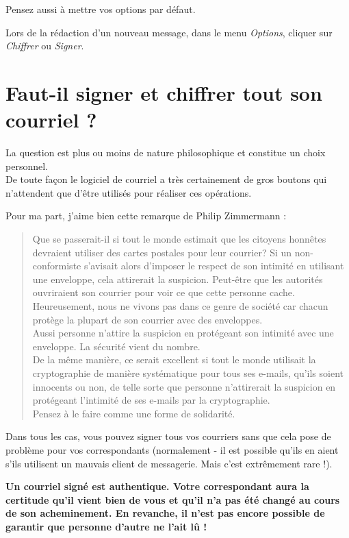 Pensez aussi à mettre vos options par défaut.

Lors de la rédaction d'un nouveau message, dans le menu \emph{Options},
cliquer sur \emph{Chiffrer} ou \emph{Signer}.

\section{Faut-il signer et chiffrer tout son courriel ?}\label{faut-il-signer-et-chiffrer-tout-son-courriel}

La question est plus ou moins de nature philosophique et constitue un
choix personnel.\\De toute façon le logiciel de courriel a très
certainement de gros boutons qui n'attendent que d'être utilisés pour
réaliser ces opérations.

Pour ma part, j'aime bien cette remarque de Philip Zimmermann :

\begin{quote}
Que se passerait-il si tout le monde estimait que les citoyens honnêtes
devraient utiliser des cartes postales pour leur courrier? Si un
non-conformiste s'avisait alors d'imposer le respect de son intimité en
utilisant une enveloppe, cela attirerait la suspicion. Peut-être que les
autorités ouvriraient son courrier pour voir ce que cette personne
cache.\\Heureusement, nous ne vivons pas dans ce genre de société car
chacun protège la plupart de son courrier avec des enveloppes.\\Aussi
personne n'attire la suspicion en protégeant son intimité avec une
enveloppe. La sécurité vient du nombre.\\De la même manière, ce serait
excellent si tout le monde utilisait la cryptographie de manière
systématique pour tous ses e-mails, qu'ils soient innocents ou non, de
telle sorte que personne n'attirerait la suspicion en protégeant
l'intimité de ses e-mails par la cryptographie.\\Pensez à le faire comme
une forme de solidarité.
\end{quote}

Dans tous les cas, vous pouvez signer tous vos courriers sans que cela
pose de problème pour vos correspondants (normalement - il est possible
qu'ils en aient s'ils utilisent un mauvais client de messagerie. Mais
c'est extrêmement rare !).

\textbf{Un courriel signé est authentique. Votre correspondant aura la
certitude qu'il vient bien de vous et qu'il n'a pas été changé au cours
de son acheminement. En revanche, il n'est pas encore possible de
garantir que personne d'autre ne l'ait lû !}

